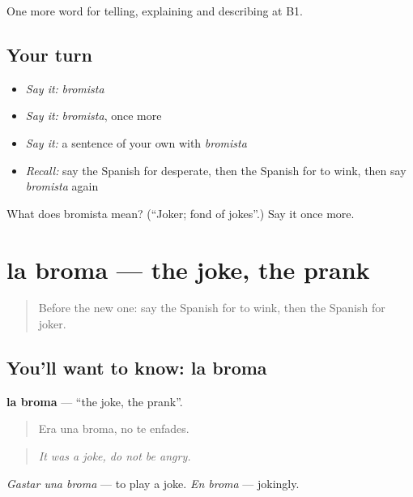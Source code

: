 \begin{grammarlens}[title={What you've built}]
One more word for telling, explaining and describing at B1.
\end{grammarlens}

\subsection*{Your turn}
\begin{itemize}
\raggedright
  \item \emph{Say it:} \emph{bromista}
  \item \emph{Say it:} \emph{bromista}, once more
  \item \emph{Say it:} a sentence of your own with \emph{bromista}
  \item \emph{Recall:} say the Spanish for desperate, then the Spanish for to wink, then say \emph{bromista} again
\end{itemize}

\begin{tcolorbox}[breakable,colback=teal!4,colframe=teal!35!black,title={Before you move on}]
What does bromista mean? (\textquotedblleft{}Joker; fond of jokes\textquotedblright{}.) Say it once more.
\end{tcolorbox}
\section[la broma]{la broma — the joke, the prank}

\label{lesson:ES-C718-broma}



\begin{quote}
Before the new one: say the Spanish for to wink, then the Spanish for joker.
\end{quote}

\subsection*{You'll want to know: la broma}
\textbf{la broma} — \textquotedblleft{}the joke, the prank\textquotedblright{}.

\begin{quote}
Era una broma, no te enfades.
\end{quote}

\begin{quote}
\emph{It was a joke, do not be angry.}
\end{quote}

\emph{Gastar una broma} — to play a joke. \emph{En broma} — jokingly.


